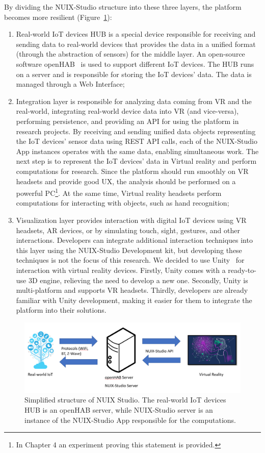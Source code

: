 By dividing the NUIX-Studio structure into these three layers, the platform becomes more resilient (Figure~\ref{fig:BasicPlatformStructure-figure}): 
\begin{enumerate}
    \item Real-world IoT devices HUB is a special device responsible for receiving and sending data to real-world devices that provides the data in a unified format (through the abstraction of sensors) for the middle layer. An open-source software openHAB~\cite{OpenHab} is used to support different IoT devices. The HUB runs on a server and is responsible for storing the IoT devices' data. The data is managed through a Web Interface;
    \item Integration layer is responsible for analyzing data coming from VR and the real-world, integrating real-world device data into VR (and vice-versa), performing persistence, and providing an API for using the platform in research projects. By receiving and sending unified data objects representing the IoT devices' sensor data using REST API calls, each of the NUIX-Studio App instances operates with the same data, enabling simultaneous work. The next step is to represent the IoT devices' data in Virtual reality and perform computations for research. Since the platform should run smoothly on VR headsets and provide good UX, the analysis should be performed on a powerful PC\footnote{In Chapter 4 an experiment proving this statement is provided.}. At the same time, Virtual reality headsets perform computations for interacting with objects, such as hand recognition;
    \item Visualization layer provides interaction with digital IoT devices using VR headsets, AR devices, or by simulating touch, sight, gestures, and other interactions. Developers can integrate additional interaction techniques into this layer using the NUIX-Studio Development kit, but developing these techniques is not the focus of this research. We decided to use Unity~\cite{Unity} for interaction with virtual reality devices. Firstly, Unity comes with a ready-to-use 3D engine, relieving the need to develop a new one. Secondly, Unity is multi-platform and supports VR headsets. Thirdly, developers are already familiar with Unity development, making it easier for them to integrate the platform into their solutions.
\end{enumerate}

\begin{figure}
  \centering
  \includegraphics[width=0.9\linewidth]{figures/BasicPlatformStructure.png}
  \caption{Simplified structure of NUIX Studio. The real-world IoT devices HUB is an openHAB server, while NUIX-Studio server is an instance of the NUIX-Studio App responsible for the computations.}
  \label{fig:BasicPlatformStructure-figure}
\end{figure}


